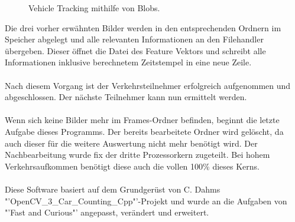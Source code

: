 \begin{figure}[H]
\caption{Vehicle Tracking mithilfe von Blobs.}
\label{bMotionDetection}
\end{figure}

Die drei vorher erwähnten Bilder werden in den entsprechenden Ordnern im Speicher abgelegt und alle relevanten Informationen an den Filehandler übergeben. Dieser öffnet die Datei des Feature Vektors und schreibt alle Informationen inklusive berechnetem Zeitstempel in eine neue Zeile. \\\\
Nach diesem Vorgang ist der Verkehrsteilnehmer erfolgreich aufgenommen und abgeschlossen. Der nächste Teilnehmer kann nun ermittelt werden.\\\\
Wenn sich keine Bilder mehr im Frames-Ordner befinden, beginnt die letzte Aufgabe dieses Programms. Der bereits bearbeitete Ordner wird gelöscht, da auch dieser für die weitere Auswertung nicht mehr benötigt wird. Der Nachbearbeitung wurde fix der dritte Prozessorkern zugeteilt. Bei hohem Verkehrsaufkommen benötigt diese auch die vollen 100\% dieses Kerns.\\\\
Diese Software basiert auf dem Grundgerüst von C. Dahms "'OpenCV\_3\_Car\_Counting\_Cpp"'-Projekt \cite{OpenCVCC} und wurde an die Aufgaben von "'Fast and Curious"' angepasst, verändert und erweitert.


